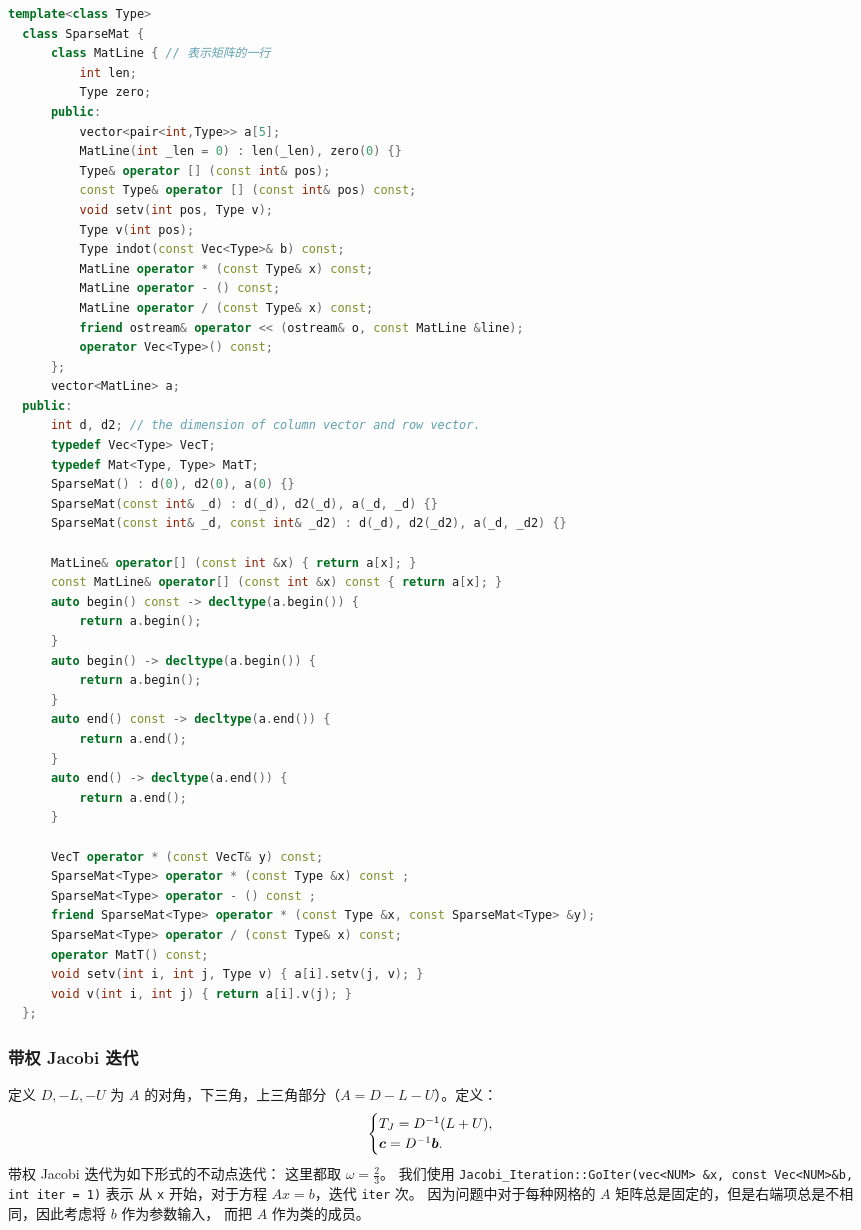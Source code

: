 \documentclass[lang=cn,a4paper,newtx,bibend=bibtex]{elegantpaper}
\begin{document}
\begin{lstlisting}[language=C++]
  template<class Type>
  class SparseMat {
      class MatLine { // 表示矩阵的一行
          int len;
          Type zero;
      public:
          vector<pair<int,Type>> a[5];
          MatLine(int _len = 0) : len(_len), zero(0) {}
          Type& operator [] (const int& pos);
          const Type& operator [] (const int& pos) const;
          void setv(int pos, Type v);
          Type v(int pos);
          Type indot(const Vec<Type>& b) const;
          MatLine operator * (const Type& x) const;
          MatLine operator - () const;
          MatLine operator / (const Type& x) const;
          friend ostream& operator << (ostream& o, const MatLine &line);
          operator Vec<Type>() const;
      };
      vector<MatLine> a;
  public:
      int d, d2; // the dimension of column vector and row vector.
      typedef Vec<Type> VecT;
      typedef Mat<Type, Type> MatT;
      SparseMat() : d(0), d2(0), a(0) {}
      SparseMat(const int& _d) : d(_d), d2(_d), a(_d, _d) {}
      SparseMat(const int& _d, const int& _d2) : d(_d), d2(_d2), a(_d, _d2) {}
      
      MatLine& operator[] (const int &x) { return a[x]; }
      const MatLine& operator[] (const int &x) const { return a[x]; }
      auto begin() const -> decltype(a.begin()) {
          return a.begin();
      }
      auto begin() -> decltype(a.begin()) {
          return a.begin();
      }
      auto end() const -> decltype(a.end()) {
          return a.end();
      }
      auto end() -> decltype(a.end()) {
          return a.end();
      }
  
      VecT operator * (const VecT& y) const;
      SparseMat<Type> operator * (const Type &x) const ;
      SparseMat<Type> operator - () const ;
      friend SparseMat<Type> operator * (const Type &x, const SparseMat<Type> &y);
      SparseMat<Type> operator / (const Type& x) const;
      operator MatT() const;
      void setv(int i, int j, Type v) { a[i].setv(j, v); }
      void v(int i, int j) { return a[i].v(j); }
  };
\end{lstlisting}

\subsubsection{带权 Jacobi 迭代}

定义 $D, -L, -U$ 为 $A$ 的对角，下三角，上三角部分（$A = D - L - U$）。定义：
\[
  \begin{cases} 
    T_J = D^{-1} (L + U), \\
    \bm{c} = D^{-1} \bm{b}.
   \end{cases}
\]
带权 Jacobi 迭代为如下形式的不动点迭代：
这里都取 $\omega = \frac23$。
我们使用 \lstinline{Jacobi_Iteration::GoIter(vec<NUM> &x, const Vec<NUM>&b, int iter = 1)} 表示
从 \lstinline{x} 开始，对于方程 $Ax = b$，迭代 \lstinline{iter} 次。
因为问题中对于每种网格的 $A$ 矩阵总是固定的，但是右端项总是不相同，因此考虑将 $b$ 作为参数输入，
而把 $A$ 作为类的成员。
\end{document}
